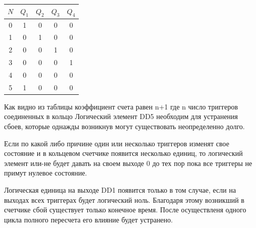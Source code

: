 \documentclass[a4paper]{article}
\begin{document}
    \begin{table}[ht]
    \centering
    \begin{tabular}{|c|c|c|c|c|}
    \hline
    $N $ & $Q_1$ & $Q_2$ & $Q_3$ & $Q_4$ \\
    \hline
    0 & 1 & 0 & 0 & 0 \\
    1 & 0 & 1 & 0 & 0 \\
    2 & 0 & 0 & 1 & 0 \\
    3 & 0 & 0 & 0 & 1 \\
    4 & 0 & 0 & 0 & 0 \\
    5 & 1 & 0 & 0 & 0 \\
    \hline
    \end{tabular}
    \end{table}

    Как видно из таблицы коэффициент счета равен n+1 где n число триггеров соединенных в кольцо
    Логический элемент DD5 необходим для устранения сбоев, которые однажды возникнув могут существовать неопределенно долго.

    Если по какой либо причине один или несколько триггеров изменят свое состояние и в кольцевом счетчике появится несколько единиц, то логический элемент или-не будет давать на своем выходе 0 до тех пор пока все триггеры не примут нулевое состояние.

    Логическая единица на выходе DD1 появится только в том случае, если на выходах всех триггерах будет логический ноль. Благодаря этому возникший в счетчике сбой существует только конечное время. После осуществленя одного цикла полного пересчета его влияние будет устранено.
\end{document}
